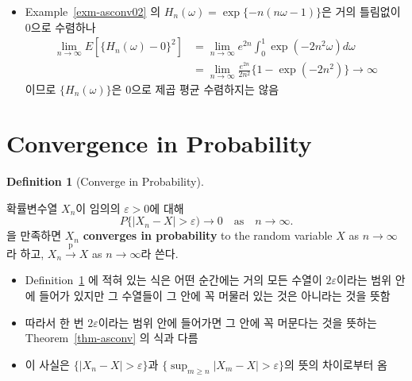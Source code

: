 \documentclass[
  letterpaper,
  DIV=11,
  numbers=noendperiod]{scrreprt}
\providecommand{\tightlist}{%
  \setlength{\itemsep}{0pt}\setlength{\parskip}{0pt}}
\theoremstyle{definition}
\theoremstyle{plain}
\theoremstyle{plain}
\theoremstyle{definition}
\theoremstyle{plain}
\theoremstyle{definition}
\newtheorem{definition}{Definition}[chapter]
\theoremstyle{remark}
\begin{document}
\begin{itemize}
\tightlist
\item
  Example~\ref{exm-asconv02} 의
  \(H_n(\omega)=\exp \{-n (n\omega - 1) \}\)은 거의 틀림없이 0으로
  수렴하나 \[
  \begin{align*}
  \lim_{n\rightarrow\infty}E[\{ H_n (\omega) - 0 \}^2] &= \lim_{n\rightarrow\infty} e^{2n} \int_{0}^1 \exp (-2n^2 \omega) d\omega\\ &= \lim_{n\rightarrow\infty}\frac{e^{2n}}{2n^2}\{ 1-\exp(-2n^2)\}\rightarrow\infty
  \end{align*}
  \] 이므로 \(\{H_n(\omega)\}\)은 0으로 제곱 평균 수렴하지는 않음
\end{itemize}

\section{Convergence in Probability}\label{convergence-in-probability}

\begin{definition}[Converge in
Probability]\protect\hypertarget{def-pconv}{}\label{def-pconv}

확률변수열 \(X_n\)이 임의의 \(\varepsilon>0\)에 대해 \[
P\{ |X_n-X| >\varepsilon) \rightarrow 0 \quad{} \text{as} \quad{} n\rightarrow \infty.
\] 을 만족하면 \(X_n\) \textbf{converges in probability} to the random
variable \(X\) as \(n\rightarrow \infty\)라 하고,
\(X_n \stackrel{\text{p}}{\rightarrow}X\) as \(n\rightarrow \infty\)라
쓴다.

\end{definition}

\begin{tcolorbox}[enhanced jigsaw, left=2mm, arc=.35mm, leftrule=.75mm, colback=white, title=\textcolor{quarto-callout-tip-color}{\faLightbulb}\hspace{0.5em}{Remark}, rightrule=.15mm, breakable, bottomrule=.15mm, coltitle=black, opacitybacktitle=0.6, opacityback=0, toptitle=1mm, titlerule=0mm, toprule=.15mm, colbacktitle=quarto-callout-tip-color!10!white, bottomtitle=1mm, colframe=quarto-callout-tip-color-frame]

\begin{itemize}
\item
  Definition~\ref{def-pconv} 에 적혀 있는 식은 어떤 순간에는 거의 모든
  수열이 \(2\varepsilon\)이라는 범위 안에 들어가 있지만 그 수열들이 그
  안에 꼭 머물러 있는 것은 아니라는 것을 뜻함
\item
  따라서 한 번 \(2\varepsilon\)이라는 범위 안에 들어가면 그 안에 꼭
  머문다는 것을 뜻하는 Theorem~\ref{thm-asconv} 의 식과 다름
\item
  이 사실은 \(\{|X_n - X|> \varepsilon\}\)과
  \(\{\sup_{m\geq n} |X_m-X|>\varepsilon \}\)의 뜻의 차이로부터 옴
\end{itemize}

\end{tcolorbox}
\end{document}
